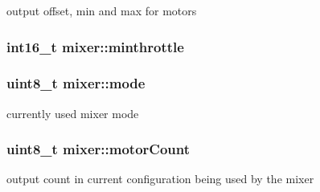 output offset, min and max for motors 

\hypertarget{structmixer_ab268773664c6d4abe3b4e12c0477d879}{
\subsubsection[{minthrottle}]{\setlength{\rightskip}{0pt plus 5cm}int16\+\_\+t mixer\+::minthrottle}}\label{structmixer_ab268773664c6d4abe3b4e12c0477d879}
\hypertarget{structmixer_a5084dbc956f4788f1fb4d6af606548a1}{
\subsubsection[{mode}]{\setlength{\rightskip}{0pt plus 5cm}uint8\+\_\+t mixer\+::mode}}\label{structmixer_a5084dbc956f4788f1fb4d6af606548a1}


currently used mixer mode 

\hypertarget{structmixer_afc295dd897528506ed9e412ce1f9966e}{
\subsubsection[{motor\+Count}]{\setlength{\rightskip}{0pt plus 5cm}uint8\+\_\+t mixer\+::motor\+Count}}\label{structmixer_afc295dd897528506ed9e412ce1f9966e}


output count in current configuration being used by the mixer 

